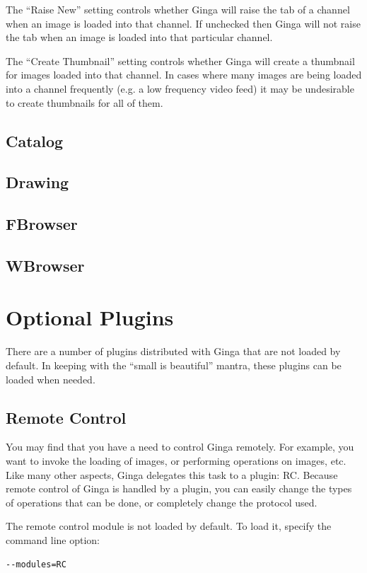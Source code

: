 \documentclass[11pt]{report}
\begin{document}
The ``Raise New'' setting controls whether Ginga will raise the tab of a
channel when an image is loaded into that channel.  If unchecked then
Ginga will not raise the tab when an image is loaded into that
particular channel.

The ``Create Thumbnail'' setting controls whether Ginga will create a
thumbnail for images loaded into that channel.  In cases where many
images are being loaded into a channel frequently (e.g. a low frequency
video feed) it may be undesirable to create thumbnails for all of them.

\subsection{Catalog}
\subsection{Drawing}
\subsection{FBrowser}
\subsection{WBrowser}

\section{Optional Plugins}
\label{sec:optionalplugins}
There are a number of plugins distributed with Ginga that are not loaded
by default.  In keeping with the ``small is beautiful'' mantra, these
plugins can be loaded when needed.

\subsection{Remote Control}
\label{sec:remotecontrol}
You may find that you have a need to control Ginga remotely.  For
example, you want to invoke the loading of images, or performing
operations on images, etc.  Like many other aspects, Ginga delegates this
task to a plugin: RC.  
Because remote control of Ginga is handled by a plugin, you can easily
change the types of operations that can be done, or completely change
the protocol used.

The remote control module is not loaded by default.  To load it, specify
the command line option:
\begin{verbatim}
--modules=RC
\end{verbatim}
\end{document}
